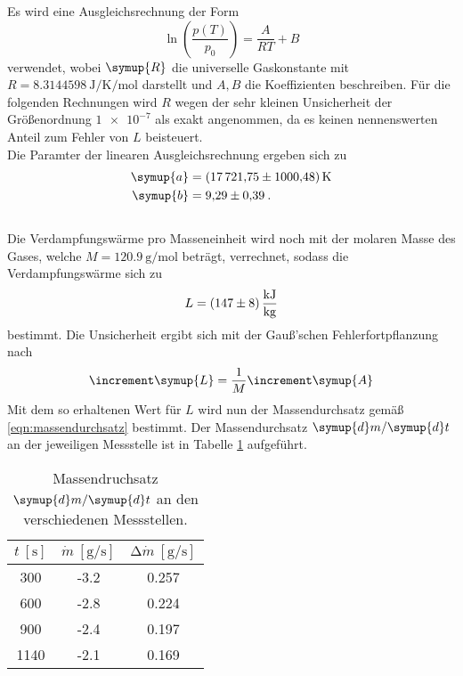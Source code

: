 Es wird eine Ausgleichsrechnung der Form
\begin{equation}
  \ln\left(\frac{p(T)}{p_0}\right)= \frac{A}{R T} + B
\end{equation}
verwendet, wobei $\symup{R}$ die universelle Gaskonstante mit
$R = \SI{8.3144598}{\joule\per\kelvin\per\mol}$\cite{gaskonst} darstellt und $A, B$
die Koeffizienten beschreiben. Für die folgenden Rechnungen wird
$R$ wegen der sehr kleinen Unsicherheit der Größenordnung $\num{1e-7}$ als exakt
angenommen, da es keinen nennenswerten Anteil zum Fehler von $L$ beisteuert.
\\
Die Paramter der linearen Ausgleichsrechnung ergeben sich zu
\begin{align*}
  \symup{a} &= \SI{17721.75 \pm 1000.48}{\kelvin} \\
  \symup{b} &= \num{9.29(39)} \:.
\end{align*}
\\
Die Verdampfungswärme pro Masseneinheit wird noch mit der molaren Masse des
Gases, welche $M = \SI{120.9}{\gram\per\mol}$ beträgt, verrechnet, sodass die
Verdampfungswärme sich zu
\begin{equation}
  L = \SI{147 \pm 8}{\kilo\joule\per\kilo\gram}
\end{equation}
bestimmt.
Die Unsicherheit ergibt sich mit der Gauß'schen Fehlerfortpflanzung nach
\begin{equation}
  \increment \symup{L} = \frac{1}{M} \increment \symup{A}
  \label{eqn:gauss}
\end{equation}
Mit dem so erhaltenen Wert für $L$ wird nun der Massendurchsatz gemäß
\eqref{eqn:massendurchsatz} bestimmt.
Der Massendurchsatz $\symup{d}m / \symup{d}t$ an der jeweiligen Messstelle ist
in Tabelle \ref{tab:durchsätzli} aufgeführt.

\begin{table}
  \centering
  \caption{Massendruchsatz $\symup{d}m / \symup{d}t$ an den verschiedenen Messstellen.}
  \label{tab:durchsätzli}
  \begin{tabular}{c c c}
    \toprule
    {$t \: [\si{\second}]$} & {$\dot{m} \: [\si{\gram\per\second}]$}
    & {$\increment \dot{m} \: [\si{\gram\per\second}]$} \\
    \midrule
    300  & -3.2 & 0.257 \\
    600  & -2.8 & 0.224 \\
    900  & -2.4 & 0.197 \\
    1140 & -2.1 & 0.169 \\
    \bottomrule
  \end{tabular}
\end{table}

